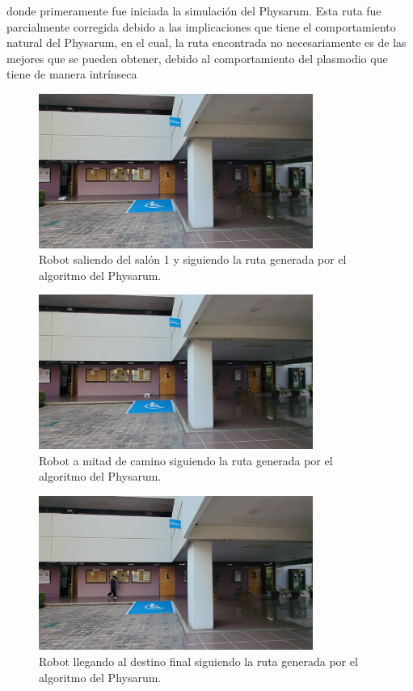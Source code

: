         donde primeramente fue iniciada la simulaci\'on del Physarum. Esta ruta fue
        parcialmente corregida debido a las implicaciones que tiene el comportamiento
        natural del Physarum, en el cual, la ruta encontrada no necesariamente es de las
        mejores que se pueden obtener, debido al comportamiento del plasmodio que tiene
        de manera intr\'inseca
    \vskip 0.5cm
    \begin{figure}[h!]
        \centering
        \includegraphics[width=0.8\textwidth]{./images/Pruebas/Imagen2.png}
        \caption{Robot saliendo del sal\'on 1 y siguiendo la ruta generada por el algoritmo del Physarum.}
        \label{fig:Mapa_ESCOM_Robot}
    \end{figure}
    \vskip 0.5cm
    \begin{figure}[h!]
        \centering
        \includegraphics[width=0.8\textwidth]{./images/Pruebas/Imagen3.png}
        \caption{Robot a mitad de camino siguiendo la ruta generada por el algoritmo del Physarum.}
        \label{fig:Mapa_ESCOM_Robot2}
    \end{figure}
    \vskip 0.5cm
    \begin{figure}[h!]
        \centering
        \includegraphics[width=0.8\textwidth]{./images/Pruebas/Imagen4.png}
        \caption{Robot llegando al destino final siguiendo la ruta generada por el algoritmo del Physarum.}
        \label{fig:Mapa_ESCOM_Robot3}
    \end{figure}
